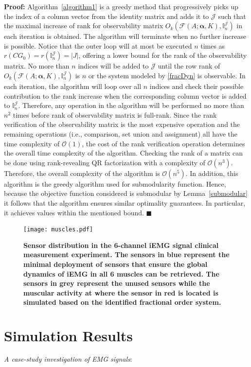 {
\textbf{Proof: } Algorithm~\ref{algorithm1} is a greedy method that progressively picks up the index of a column vector from the identity matrix and adds it to $\mathcal J$ such that the maximal increase of rank for observability matrix $O_k(\mathcal F(A;\mathbf{\alpha},K),\mathbb{I}_n^{\mathcal J})$ in each iteration is obtained. The algorithm will terminate when no further increase is possible. Notice that the outer loop will at most be executed $n$ times as $r(CG_{0})=r(\mathbb{I}_n^{\mathcal J})=|J|$, offering a lower bound for the rank of the observability matrix. No more than $n$ indices will be added to $\mathcal J$ until the row rank of $O_k(\mathcal F(A;\mathbf{\alpha},K),\mathbb{I}_n^{\mathcal J})$ is $n$ or the system modeled by \eqref{fracDyn} is observable. In each iteration, the algorithm will loop over all $n$ indices and check their possible contribution to the rank increase when the corresponding column vector is added to $\mathbb{I}_n^{\mathcal J}$. Therefore, any operation in the algorithm will be performed no more than $n^2$ times before rank of observability matrix is full-rank. Since the rank verification of the observability matrix is the most expensive operation and the remaining operations (i.e., comparison, set union and assignment) all have the time complexity of $\mathcal O(1)$, the cost of the rank verification operation determines the overall time complexity of the algorithm. Checking the rank of a matrix can be done using rank-revealing QR factorization with a complexity of $\mathcal O(n^3)$. Therefore, the overall complexity of the algorithm is $\mathcal O(n^5)$. In addition, this algorithm is the greedy algorithm used for submodularity function. Hence, because the objective function considered is submodular by Lemma~\ref{submodular} it follows that the algorithm ensures similar optimality guarantees. In particular, it achieves values within the mentioned bound.
\hfill $\blacksquare$
}
\begin{figure}[tb]
\centering
\texttt{[image: muscles.pdf]}
\caption{\textbf{Sensor distribution in the 6-channel iEMG signal clinical measurement experiment. The sensors in blue represent the minimal deployment of sensors that ensure the global dynamics of iEMG in all 6 muscles can be retrieved. The sensors in grey represent the unused sensors while the muscular activity at where the sensor in red is located is simulated based on the identified fractional order system.}}\label{fig:EMG_exp}
\vskip -6mm
\end{figure}   
\section{Simulation Results}\label{illustExam}
\textit{A case-study investigation of EMG signals}:

